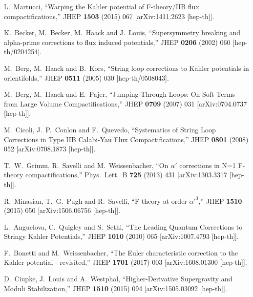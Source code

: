 \documentclass[11pt,a4paper]{article}
\begin{document}
\begin{itemize}
\begin{thebibliography}{99}
  L.~Martucci,
  ``Warping the Kahler potential of F-theory/IIB flux compactifications,''
  JHEP {\bf 1503} (2015) 067
  [arXiv:1411.2623 [hep-th]].

  K.~Becker, M.~Becker, M.~Haack and J.~Louis,
  ``Supersymmetry breaking and alpha-prime corrections to flux induced potentials,''
  JHEP {\bf 0206} (2002) 060
  [hep-th/0204254].

  M.~Berg, M.~Haack and B.~Kors,
  ``String loop corrections to Kahler potentials in orientifolds,''
  JHEP {\bf 0511} (2005) 030
  [hep-th/0508043].

  M.~Berg, M.~Haack and E.~Pajer,
  ``Jumping Through Loops: On Soft Terms from Large Volume Compactifications,''
  JHEP {\bf 0709} (2007) 031
  [arXiv:0704.0737 [hep-th]].

  M.~Cicoli, J.~P.~Conlon and F.~Quevedo,
  ``Systematics of String Loop Corrections in Type IIB Calabi-Yau Flux Compactifications,''
  JHEP {\bf 0801} (2008) 052
  [arXiv:0708.1873 [hep-th]].

  T.~W.~Grimm, R.~Savelli and M.~Weissenbacher,
  ``On $\alpha'$ corrections in N=1 F-theory compactifications,''
  Phys.\ Lett.\ B {\bf 725} (2013) 431
  [arXiv:1303.3317 [hep-th]].

  R.~Minasian, T.~G.~Pugh and R.~Savelli,
  ``F-theory at order $\alpha'^3$,''
  JHEP {\bf 1510} (2015) 050
  [arXiv:1506.06756 [hep-th]].

  L.~Anguelova, C.~Quigley and S.~Sethi,
  ``The Leading Quantum Corrections to Stringy Kahler Potentials,''
  JHEP {\bf 1010} (2010) 065
  [arXiv:1007.4793 [hep-th]].

  F.~Bonetti and M.~Weissenbacher,
  ``The Euler characteristic correction to the Kahler potential - revisited,''
  JHEP {\bf 1701} (2017) 003
  [arXiv:1608.01300 [hep-th]].

  D.~Ciupke, J.~Louis and A.~Westphal,
  ``Higher-Derivative Supergravity and Moduli Stabilization,''
  JHEP {\bf 1510} (2015) 094
  [arXiv:1505.03092 [hep-th]].


\end{thebibliography}
\end{itemize}
\end{document}
